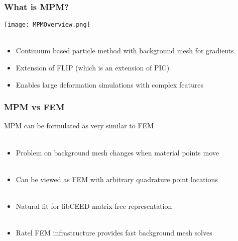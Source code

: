 \documentclass{beamer}
\begin{document}
\begin{frame}
\begin{center}
\frametitle{What is MPM?}

\texttt{[image: MPMOverview.png]}\\

~\\

\begin{itemize}

\item Continuum based particle method with background mesh for gradients\\

\item Extension of FLIP (which is an extension of PIC)\\

\item Enables large deformation simulations with complex features\\

\end{itemize}

\end{center}
\end{frame}


\begin{frame}
\begin{center}
\frametitle{MPM vs FEM}

MPM can be formulated as very similar to FEM\\

~\\

\begin{itemize}

\item Problem on background mesh changes when material points move\\

~\\

\item Can be viewed as FEM with arbitrary quadrature point locations\\

~\\

\item Natural fit for libCEED matrix-free representation\\

~\\

\item Ratel FEM infrastructure provides fast background mesh solves\\

\end{itemize}

\end{center}
\end{frame}
\end{document}

